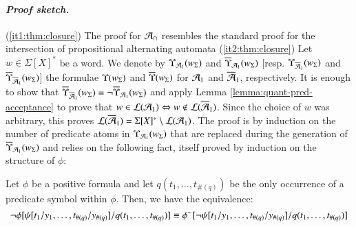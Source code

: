 \paragraph{\em Proof sketch.} (\ref{it1:thm:closure})
The proof for $\mathcal{A}_\cap$ resembles the standard proof for the
intersection of propositional alternating automata
\cite{IosifXu18Arxiv} (\ref{it2:thm:closure}) Let $w \in \Sigma[X]^*$
be a word. We denote by $\Upsilon_{\mathcal{A}_1}({{w}_\Sigma})$ and
$\overline{\Upsilon}_{\mathcal{A}_1}({{w}_\Sigma})$
[resp. $\Upsilon_{\overline{\mathcal{A}}_1}({{w}_\Sigma})$ and
  $\overline{\Upsilon}_{\overline{\mathcal{A}}_1}({{w}_\Sigma})$] the formulae
$\Upsilon({{w}_\Sigma})$ and $\overline{\Upsilon}({{w}_\Sigma})$ for $\mathcal{A}_1$ and
$\overline{\mathcal{A}}_1$, respectively. It is enough to show that
$\overline{\Upsilon}_{\overline{\mathcal{A}}_1}({{w}_\Sigma}) =
\neg\overline{\Upsilon}_{\mathcal{A}_1}({{w}_\Sigma})$ and apply Lemma
\ref{lemma:quant-pred-acceptance} to prove that $w \in {\mathcal L}({\mathcal{A}_1})
\Leftrightarrow w \not\in {\mathcal L}({\overline{\mathcal{A}}_1})$. Since the choice of $w$ was
arbitrary, this proves ${\mathcal L}({\overline{\mathcal{A}}_1}) = \Sigma[X]^* \setminus
{\mathcal L}({\mathcal{A}_1})$. The proof is by induction on the number of predicate
atoms in $\Upsilon_{\mathcal{A}_1}({{w}_\Sigma})$ that are replaced during the
generation of $\overline{\Upsilon}_{\mathcal{A}_1}({{w}_\Sigma})$ and relies on the
following fact, itself proved by induction on the structure of $\phi$:
  \begin{fact}\label{fact:dual-neg}
    Let $\phi$ be a positive formula and let $q(t_1,\ldots,t_{\#(q)})$
    be the only occurrence of a predicate symbol within $\phi$. Then,
    we have the equivalence:
    \[\neg\phi[\psi[t_1/y_1,\ldots,t_{\#(q)}/y_{\#(q)}]/q(t_1,\ldots,t_{\#(q)})]
    \equiv
    {\phi}^{\sim}[\neg\psi[t_1/y_1,\ldots,t_{\#(q)}/y_{\#(q)}]/q(t_1,\ldots,t_{\#(q)})]\]
  \end{fact}
\fi
